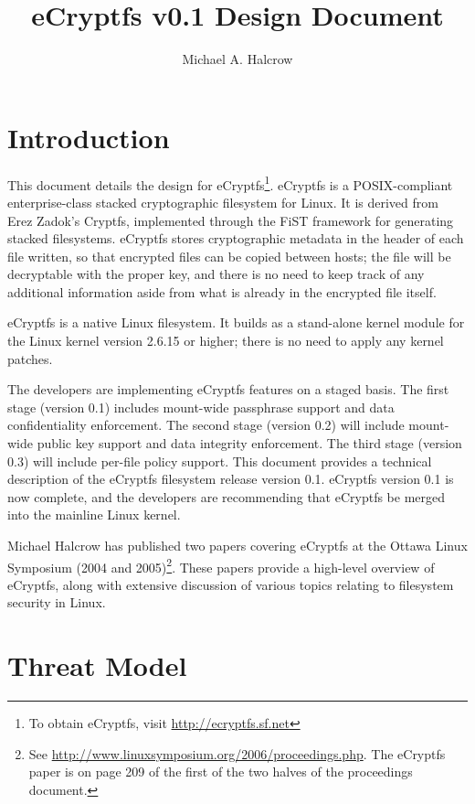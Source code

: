 \documentclass{article}
\begin{document}
\title{eCryptfs v0.1 Design Document}

\author{Michael A. Halcrow}

\maketitle

\tableofcontents

\section{Introduction}

This document details the design for eCryptfs\footnote{To obtain
eCryptfs, visit \url{http://ecryptfs.sf.net}}. eCryptfs is a
POSIX-compliant enterprise-class stacked cryptographic filesystem for
Linux. It is derived from Erez Zadok's Cryptfs, implemented through
the FiST framework for generating stacked filesystems. eCryptfs stores
cryptographic metadata in the header of each file written, so that
encrypted files can be copied between hosts; the file will be
decryptable with the proper key, and there is no need to keep track of
any additional information aside from what is already in the encrypted
file itself.

eCryptfs is a native Linux filesystem. It builds as a stand-alone
kernel module for the Linux kernel version 2.6.15 or higher; there is
no need to apply any kernel patches.

The developers are implementing eCryptfs features on a staged
basis. The first stage (version 0.1) includes mount-wide passphrase
support and data confidentiality enforcement. The second stage
(version 0.2) will include mount-wide public key support and data
integrity enforcement. The third stage (version 0.3) will include
per-file policy support. This document provides a technical
description of the eCryptfs filesystem release version 0.1. eCryptfs
version 0.1 is now complete, and the developers are recommending that
eCryptfs be merged into the mainline Linux kernel.

Michael Halcrow has published two papers covering eCryptfs at the
Ottawa Linux Symposium (2004 and 2005)\footnote{See
\url{http://www.linuxsymposium.org/2006/proceedings.php}. The eCryptfs
paper is on page 209 of the first of the two halves of the proceedings
document.}. These papers provide a high-level overview of eCryptfs,
along with extensive discussion of various topics relating to
filesystem security in Linux.

\section{Threat Model}
\end{document}
